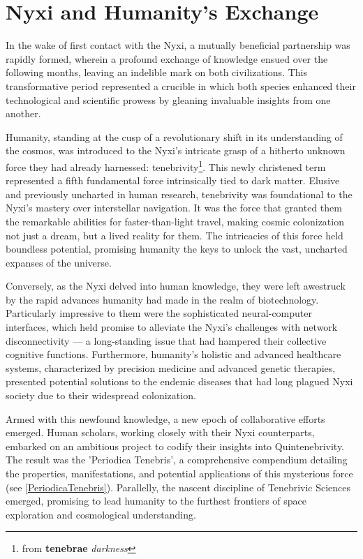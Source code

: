 \section{Nyxi and Humanity's Exchange}
In the wake of first contact with the Nyxi, a mutually beneficial partnership
was rapidly formed, wherein a profound exchange of knowledge ensued over the
following months, leaving an indelible mark on both civilizations. This
transformative period represented a crucible in which both species enhanced
their technological and scientific prowess by gleaning invaluable insights from
one another.

Humanity, standing at the cusp of a revolutionary shift in its understanding of
the cosmos, was introduced to the Nyxi's intricate grasp of a hitherto unknown
force they had already harnessed: tenebrivity\footnote{from \textbf{tenebrae}
	\textit{darkness}}. This newly christened term represented a fifth fundamental
force intrinsically tied to dark matter. Elusive and previously uncharted in
human research, tenebrivity was foundational to the Nyxi's mastery over
interstellar navigation. It was the force that granted them the remarkable
abilities for faster-than-light travel, making cosmic colonization not just a
dream, but a lived reality for them. The intricacies of this force held
boundless potential, promising humanity the keys to unlock the vast, uncharted
expanses of the universe.

Conversely, as the Nyxi delved into human knowledge, they were left awestruck
by the rapid advances humanity had made in the realm of biotechnology.
Particularly impressive to them were the sophisticated neural-computer
interfaces, which held promise to alleviate the Nyxi's challenges with network
disconnectivity — a long-standing issue that had hampered their collective
cognitive functions. Furthermore, humanity's holistic and advanced healthcare
systems, characterized by precision medicine and advanced genetic therapies,
presented potential solutions to the endemic diseases that had long plagued
Nyxi society due to their widespread colonization.

Armed with this newfound knowledge, a new epoch of collaborative efforts
emerged. Human scholars, working closely with their Nyxi counterparts, embarked
on an ambitious project to codify their insights into Quintenebrivity. The
result was the 'Periodica Tenebris', a comprehensive compendium detailing the
properties, manifestations, and potential applications of this mysterious force
(see \ref{PeriodicaTenebris}). Parallelly, the nascent discipline of Tenebrivic
Sciences emerged, promising to lead humanity to the furthest frontiers of space
exploration and cosmological understanding.

